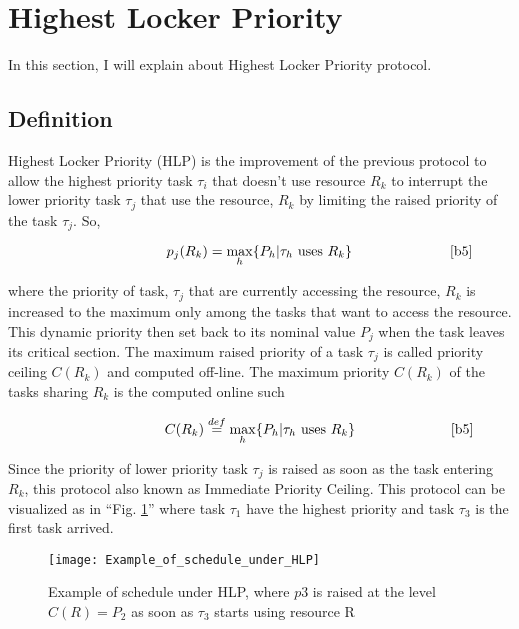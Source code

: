 \section{Highest Locker Priority}
In this section, I will explain about Highest Locker Priority protocol.

\subsection{Definition}

Highest Locker Priority (HLP) is the improvement of the previous protocol to allow the highest priority task $\tau_{i}$ that doesn't use resource $R_{k}$ to interrupt the lower priority task $\tau_{j}$ that use the resource, $R_{k}$ by limiting the raised priority of the task $\tau_{j}$. So, 
 
\begin{equation}
   \citeequation{p_{j}(R_{k})=\underset{h}{\mathrm{max}} \{P_{h}| \tau_{h} \text{   uses } R_{k}\}}{b5}\label{eq1}
\end{equation}

where the priority of task, $\tau_{j}$ that are currently accessing the resource, $R_{k}$ is increased to the maximum only among the tasks that want to access the resource. This dynamic priority then set back to its nominal value $P_{j}$ when the task leaves its critical section. The maximum raised priority of a task $\tau_{j}$ is called priority ceiling $ C(R_{k}) $ and computed off-line.  The maximum priority $ C(R_{k}) $ of the tasks sharing $ R_{k} $ is the computed online such

\begin{equation}
\citeequation{C(R_{k})\stackrel{def}{=}\underset{h}{\mathrm{max}} \{P_{h}| \tau_{h}\text{  uses }  R_{k}\}}{b5}\label{eq2}
\end{equation}

Since the priority of lower priority task $\tau_{j}$ is raised as soon as the task entering $ R_{k} $, this protocol also known as Immediate Priority Ceiling. This protocol can be visualized as in  ``Fig. \ref{fig:Example_of_schedule_under_HLP}'' where task $ \tau_{1} $ have the highest priority and task $ \tau_{3} $ is the first task arrived.

\begin{figure}[ht]
    \centering
    \texttt{[image: Example\_of\_schedule\_under\_HLP]}
    \caption{ Example of schedule under HLP, where $ p3 $ is raised at the level $ C(R) = P_{2} $ as soon as $ \tau_{3} $ starts using resource R \cite{b5}}
    \label{fig:Example_of_schedule_under_HLP}
\end{figure}

